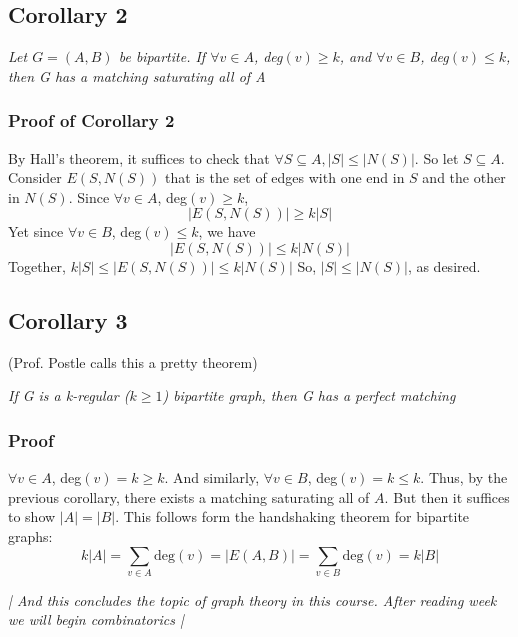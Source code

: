 \documentclass{report}
\begin{document}
\subsection{Corollary 2}
\begin{center}
\textit{Let $G = (A,B)$ be bipartite. If $\forall v \in A$, deg$(v) \geq k$, and $\forall v \in B$, deg$(v) \leq k$, then G has a matching saturating all of A}
\end{center}
\subsubsection{Proof of Corollary 2}
By Hall's theorem, it suffices to check that $\forall S \subseteq A, |S|\leq|N(S)|$. So let $S \subseteq A$. Consider $E(S, N(S))$ that is the set of edges with one end in $S$ and the other in $N(S)$. Since $\forall v \in A$, deg$(v) \geq k$,
$$|E(S,N(S))| \geq k|S|$$
Yet since $\forall v \in B$, deg$(v) \leq k$, we have
$$|E(S, N(S))| \leq k|N(S)|$$
Together, $k|S| \leq |E(S,N(S))| \leq k|N(S)|$
So, $|S| \leq |N(S)|$, as desired.
\subsection{Corollary 3}
(Prof. Postle calls this a pretty theorem)
\begin{center}
\textit{If G is a k-regular ($k \geq 1$) bipartite graph, then G has a perfect matching}
\end{center}
\subsubsection{Proof}
$\forall v \in A$, deg$(v) = k \geq k$. And similarly, $\forall v \in B$, deg$(v) = k \leq k$. Thus, by the previous corollary, there exists a matching saturating all of $A$. But then it suffices to show $|A| = |B|$. This follows form the handshaking theorem for bipartite graphs:
$$k|A| = \sum_{v \in A} \mathrm{deg}(v) = |E(A,B)| = \sum_{v\in B} \mathrm{deg}(v) = k|B|$$
\begin{center}
\textit{| And this concludes the topic of graph theory in this course. After reading week we will begin combinatorics |}
\end{center}

\end{document}
